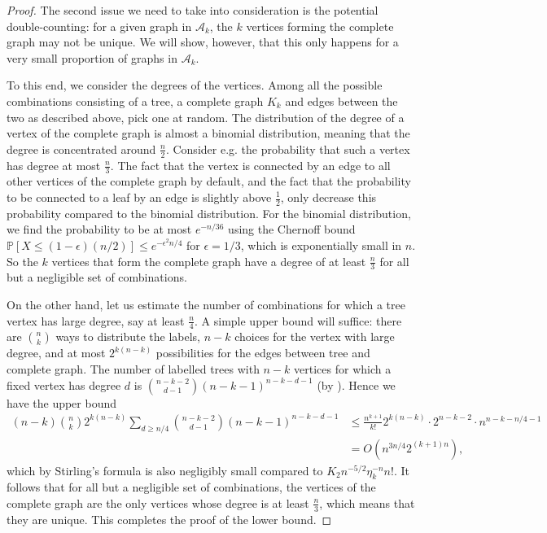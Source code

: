 \documentclass[a4paper]{article}
\newcommand{\A}{\mathcal{A}}
\theoremstyle{remark}
\begin{document}
\begin{proof}
The second issue we need to take into consideration is the potential double-counting: for a given graph in $\A_k$, the $k$ vertices forming the complete graph may not be unique. We will show, however, that this only happens for a very small proportion of graphs in $\A_k$.

To this end, we consider the degrees of the 
vertices. Among all the possible combinations consisting of a tree, a complete graph $K_k$ and edges between the two as described above, pick one at random. The distribution of the degree of a vertex of the complete graph is almost a binomial distribution, meaning that the degree is concentrated around $\frac{n}{2}$. Consider e.g. the probability that such a vertex has degree at most $\frac{n}{3}$. The fact that the vertex is connected by an edge to all other vertices of the complete graph by default, and the fact that the probability to be connected to a leaf by an edge is slightly above $\frac12$, only decrease this probability compared to the binomial distribution. For the binomial distribution, we find the probability to be at most $e^{-n/36}$ using the Chernoff bound ${\mathbb P}[X\leq (1- \epsilon) (n/2)] \leq e^{-\epsilon^2 n/4}$ for $\epsilon=1/3$, which is exponentially small in $n$.
So the $k$ vertices that form the complete graph have a degree of at least $\frac{n}{3}$ for all but a negligible set of combinations.

On the other hand, let us estimate the number of combinations for which a tree vertex has large degree, say at least $\frac{n}{4}$. A simple upper bound will suffice: there are $\binom{n}{k}$ ways to distribute the labels, $n-k$ choices for the vertex with large degree, and at most $2^{k(n-k)}$ possibilities for the edges between tree and complete graph. The number of labelled trees with $n-k$ vertices for which a fixed vertex has degree $d$ is $\binom{n-k-2}{d-1}(n-k-1)^{n-k-d-1}$ (by \cite[(1.7.5)]{Harary1973graphical}). Hence we have the upper bound
\begin{align*}
(n-k) \binom{n}{k} 2^{k(n-k)} \sum_{d \geq n/4} \binom{n-k-2}{d-1} (n-k-1)^{n-k-d-1} &\leq \frac{n^{k+1}}{k!} 2^{k(n-k)} \cdot 2^{n-k-2} \cdot n^{n-k-n/4-1} \\
&= O (n^{3n/4} 2^{(k+1)n}),
\end{align*}
which by Stirling's formula is also negligibly small compared to $K_2n^{-5/2} \eta_k^{-n} n!$. It follows that for all but a negligible set of combinations, the vertices of the complete graph are the only vertices whose degree is at least $\frac{n}{3}$, which means that they are unique. This completes the proof of the lower bound.
\end{proof}
\end{document}
